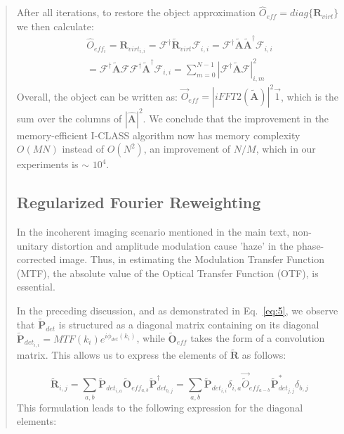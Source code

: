 \documentclass[12pt]{article}
\newenvironment{ourresponse}
    {\begin{tcolorbox}[width=\linewidth,breakable,enhanced,colback=gray!5,colframe=responsecolor!50,title=Response,left=5pt,right=5pt]}
    {\end{tcolorbox}}
\begin{document}
\begin{enumerate}[label=\arabic*.]
\begin{ourresponse}
\begin{quote}
            After all iterations, to restore the object approximation $\hat{O}_{eff}=diag\{\textbf{R}_{virt}\}$ we then calculate:
            \begin{align}
            \label{eq:14}  \tag{S14}
            &\hat{O}_{eff_i}=\textbf{R}_{virt_{i,i}}=\mathcal{F}^{\dagger}\tilde{\textbf{R}}_{virt}\mathcal{F}_{i,i}=\mathcal{F}^{\dagger}\tilde{\textbf{A}}\tilde{\textbf{A}}^\dagger\mathcal{F}_{i,i} &\\ 
            &= \mathcal{F}^{\dagger}\tilde{\textbf{A}}\mathcal{F}\mathcal{F}^{\dagger}\tilde{\textbf{A}}^\dagger\mathcal{F}_{i,i} \nonumber = \sum^{N-1}_{m=0}|\mathcal{F}^{\dagger}\tilde{\textbf{A}}\mathcal{F}|^2_{i,m} &
            \end{align}
            Overall, the object can be written as: $\vec{{O}}_{eff} =|iFFT2(\tilde{\textbf{A}})|^2\vec{1}$, which is the sum over the columns of $|{\hat{\textbf{A}}}|^2$.
            We conclude that the improvement in the memory-efficient I-CLASS algorithm now has memory complexity $O(MN)$ instead of $O(N^2)$, an improvement of $N/M$, which in our experiments is $\sim$ $10^4$.
            
            
            \subsection*{Regularized Fourier Reweighting}
            
            In the incoherent imaging scenario mentioned in the main text, non-unitary distortion and amplitude modulation cause 'haze' in the phase-corrected image. Thus, in estimating the Modulation Transfer Function (MTF), the absolute value of the Optical Transfer Function (OTF), is essential. 
            
            In the preceding discussion, and as demonstrated in Eq.~\ref{eq:5}, we observe that ${\tilde{\textbf{P}}_{det}}$ is structured as a diagonal matrix containing on its diagonal  ${\tilde{\textbf{P}}_{det_{i,i}}}=MTF(k_i)e^{i\phi_{det}(k_i)}$, while ${\tilde{\textbf{O}}_{eff}}$ takes the form of a convolution matrix. This allows us to express the elements of $\tilde{\textbf{R}}$ as follows:
            
            \begin{equation}
            \tilde{\textbf{R}}_{i,j} = \sum_{a,b}{\tilde{\textbf{P}}_{det_{i,a}}} \tilde{\textbf{O}}_{eff_{a,b}}{\tilde{\textbf{P}}^{\dagger}_{det_{b,j}}}=\sum_{a,b}{\tilde{\textbf{P}}_{det_{i,i}}} \delta_{i,a} \vec{\tilde{O}}_{eff_{a-b}}{\tilde{\textbf{P}}^*_{det_{j,j}}} \delta_{b,j}
            \label{eq:15}  \tag{S15}
            \end{equation}
            This formulation leads to the following expression for the diagonal elements:
            

\end{quote}
\end{ourresponse}
\end{enumerate}
\end{document}
